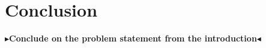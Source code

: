 \documentclass[twoside,11pt]{report}
\theoremstyle{definition}
\newcommand{\todo}[1]{{\color[rgb]{.5,0,0}\textbf{$\blacktriangleright$#1$\blacktriangleleft$}}}
\begin{document}
\chapter{Conclusion}
\label{ch:conclusion}

\todo{Conclude on the problem statement from the introduction}


\cleardoublepage
{}





\end{document}
